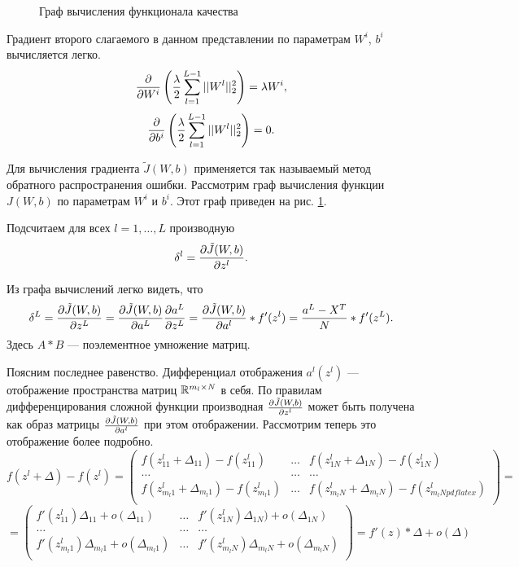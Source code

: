 \documentclass[12pt]{article}
\begin{document}
		\begin{figure}[!t]
		\centerline{}
			\caption{Граф вычисления функционала качества}
			\label{graph}
		\end{figure}

		Градиент второго слагаемого в данном представлении по параметрам $W^i$, $b^i$ вычисляется легко.
		$$\frac{\partial }{\partial W^i} \left ( \frac \lambda 2 \sum_{l=1}^{L-1} ||W^l||_2^2 \right) = \lambda W^i,$$
		$$\frac{\partial }{\partial b^i} \left ( \frac \lambda 2 \sum_{l=1}^{L-1} ||W^l||_2^2 \right) = 0.$$

		Для вычисления градиента $\tilde J(W, b)$ применяется так называемый метод обратного распространения ошибки. Рассмотрим граф вычисления функции $J(W, b)$ по параметрам $W^i$ и $b^i$. Этот граф приведен на рис. \ref{graph}. 

		Подсчитаем для всех $l = 1, \ldots, L$ производную
		$$\delta^l = \frac{\partial \tilde J (W, b)}{\partial z^l}.$$

		Из графа вычислений легко видеть, что
		$$\delta^L = \frac{\partial \tilde J(W, b)}{\partial z^L} = \frac{\partial \tilde J(W, b)}{\partial a^L} \frac{\partial a^L}{\partial z^L} = \frac{\partial \tilde J(W, b)}{\partial a^l} * f'(z^l) = \frac {a^L - X^T} {N} * f'(z^L).$$
		Здесь $A * B$ — поэлементное умножение матриц.

		Поясним последнее равенство. Дифференциал отображения $a^l(z^l)$ — отображение пространства матриц $\mathbb{R}^{m_l \times N}$ в себя. По правилам дифференцирования сложной функции производная $\frac{\partial \tilde J(W, b)}{\partial z^l}$ может быть получена как образ матрицы $\frac{\partial \tilde J(W, b)}{\partial a^l}$ при этом отображении. Рассмотрим теперь это отображение более подробно. 
		$$f(z^l + \Delta) - f(z^l) = 
		\left(
		\begin{array} {ccc}
			f(z^l_{11} + \Delta_{11}) - f(z^l_{11}) & \ldots & f(z^l_{1N} + \Delta_{1N}) - f(z^l_{1N})\\
			\ldots & \ldots & \ldots \\
			f(z^l_{m_{l}1} + \Delta_{m_{l}1}) - f(z^l_{m_{l}1}) & \ldots & f(z^l_{m_{l}N} + \Delta_{m_{l}N}) - f(z^l_{m_{l}Npdflatex })\\
		\end{array}
		\right) = 
		$$
		$$ = 
		\left(
		\begin{array} {ccc}
			f'(z^l_{11}) \Delta_{11} + o(\Delta_{11}) & \ldots & f'(z^l_{1N}) \Delta_{1N}) + o(\Delta_{1N})\\
			\ldots & \ldots & \ldots \\
			f'(z^l_{m_{l}1}) \Delta_{m_{l}1} + o(\Delta_{m_{l}1}) & \ldots & f'(z^l_{m_{l}N})  \Delta_{m_{l}N} + o(\Delta_{m_{l}N})\\
		\end{array}
		\right) = f'(z) * \Delta + o(\Delta)
		$$
\end{document}
